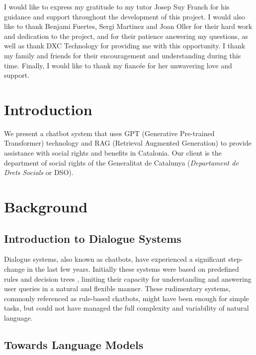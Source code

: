 \documentclass[a4paper,12pt,twoside]{ThesisStyle}
\begin{document}
I would like to express my gratitude to my tutor Josep Suy Franch for his guidance and support throughout the development of this project. I would also like to thank Benjami Fuertes, Sergi Martinez and Joan Oller for their hard work and dedication to the project, and for their patience answering my questions, as well as thank DXC Technology for providing me with this opportunity. I thank my family and friends for their encouragement and understanding during this time.
Finally, I would like to thank my fiancée for her unwavering love and support.


\tableofcontents

\listoffigures

\listoftables

\mainmatter

\chapter{Introduction}
\label{cap:intro}

We present a chatbot system that uses GPT (Generative Pre-trained Transformer) technology and RAG (Retrieval Augmented Generation) to provide assistance with social rights and benefits in Catalonia. Our client is the department of social rights of the Generalitat de Catalunya (\textit{Departament de Drets Socials} or DSO).

\chapter{Background}
\label{cap:background}

\section{Introduction to Dialogue Systems}
\label{sec:chat}

Dialogue systems, also known as chatbots, have experienced a significant step-change in the last few years. Initially these systems were based on predefined rules and decision trees \cite{Weizenbaum1966ELIZA, AbuShawar2015ALICE}, limiting their capacity for understanding and answering user queries in a natural and flexible manner. These rudimentary systems, commonly referenced as rule-based chatbots, might have been enough for simple tasks, but could not have managed the full complexity and variability of natural language.

\section{Towards Language Models}
\label{sec:language}
\end{document}
